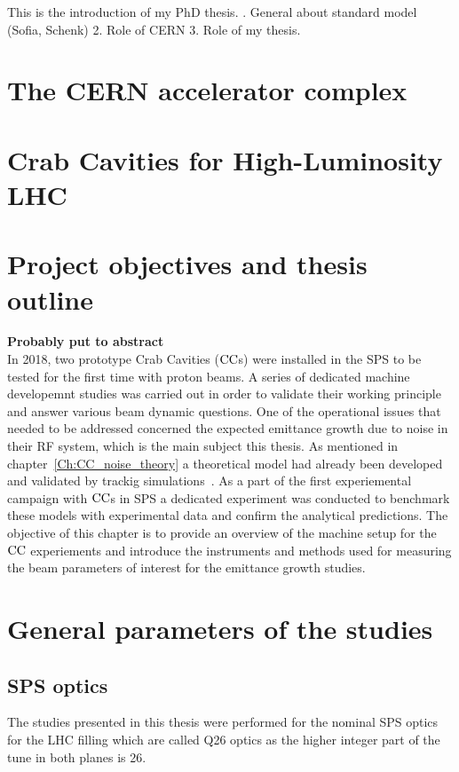 This is the introduction of my PhD thesis.
. General about standard model (Sofia, Schenk)
2. Role of CERN
3. Role of my thesis.

\section{The CERN accelerator complex}



 


\section{Crab Cavities for High-Luminosity LHC}


\section{Project objectives and thesis outline}

\textbf{Probably put to abstract}\\
In 2018, two prototype Crab Cavities (${\mathrm{CC}}$s) were installed in the SPS to be tested for the first time with proton beams. A series of dedicated machine developemnt studies was carried out in order to validate their working principle and answer various beam dynamic questions. One of the operational issues that needed to be addressed concerned the expected emittance growth due to noise in their RF system, which is the main subject this thesis.  As mentioned in chapter~\ref{Ch:CC_noise_theory} a theoretical model had already been developed and validated by trackig simulations~\cite{PhysRevSTAB.18.101001}. 
As a part of the first experiemental campaign with ${\mathrm{CC}}$s in SPS a dedicated experiment was conducted to benchmark these models with experimental data and confirm the analytical predictions. The objective of this chapter is to provide an overview of the machine setup for the ${\mathrm{CC}}$ experiements and introduce the instruments and methods used for measuring the beam parameters of interest for the emittance growth studies.

\section{General parameters of the studies}
\subsection{SPS optics}\label{subsec:SPS_optics_model}
 The studies presented in this thesis were performed for the nominal SPS optics for the LHC filling which are called Q26 optics as the higher integer part of the tune in both planes is 26. 

